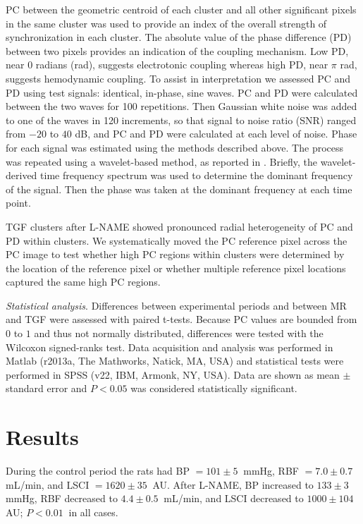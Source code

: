 	PC between the geometric centroid of each cluster and all other significant pixels in the same cluster was used to provide an index of the overall strength of synchronization in each cluster. The absolute value of the phase difference (PD) between two pixels provides an indication of the coupling mechanism. Low PD, near $0$ radians (rad), suggests electrotonic coupling whereas high PD, near $\pi$ rad, suggests hemodynamic coupling. To assist in interpretation we assessed PC and PD using test signals: identical, in-phase, sine waves. PC and PD were calculated between the two waves for 100 repetitions. Then Gaussian white noise was added to one of the waves in 120 increments, so that signal to noise ratio (SNR) ranged from $-20$ to $40$ dB, and PC and PD were calculated at each level of noise. Phase for each signal was estimated using the methods described above. The process was repeated using a wavelet-based method, as reported in \cite{HolsteinRathlou11}. Briefly, the wavelet-derived time frequency spectrum was used to determine the dominant frequency of the signal. Then the phase was taken at the dominant frequency at each time point. 
	
	TGF clusters after L-NAME showed pronounced radial heterogeneity of PC and PD within clusters. We systematically moved the PC reference pixel across the PC image to test whether high PC regions within clusters were determined by the location of the reference pixel or whether multiple reference pixel locations captured the same high PC regions.
	
	\emph{Statistical analysis}. Differences between experimental periods and between MR and TGF were assessed with paired t-tests. Because PC values are bounded from $0$ to $1$ and thus not normally distributed, differences were tested with the Wilcoxon signed-ranks test. Data acquisition and analysis was performed in Matlab (r2013a, The Mathworks, Natick, MA, USA) and statistical tests were performed in SPSS (v22, IBM, Armonk, NY, USA). Data are shown as mean $\pm$ standard error and $P<0.05$ was considered statistically significant.	

\section{Results}

	During the control period the rats had BP $ = 101 \pm 5 \ $ mmHg, RBF $ = 7.0 \pm 0.7 \ $ mL/min, and LSCI $ = 1620 \pm 35 \ $ AU. After L-NAME, BP increased to $133 \pm 3 \ $ mmHg, RBF decreased to $4.4 \pm 0.5 \ $ mL/min, and LSCI decreased to $1000 \pm 104 \ $ AU; $P<0.01 \ $ in all cases.
	
